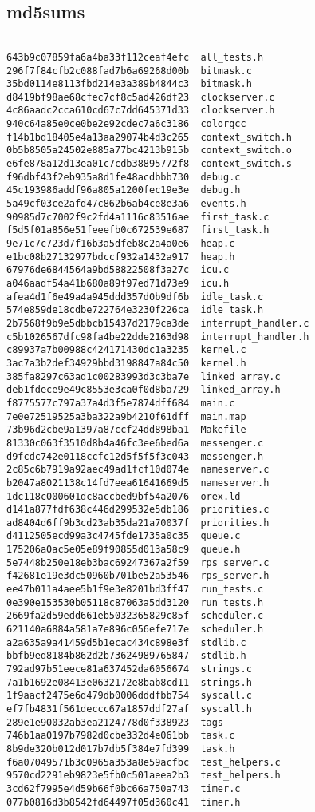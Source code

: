 \documentclass[letterpaper]{article}
\begin{document}
\subsection{md5sums}
\begin{verbatim}

643b9c07859fa6a4ba33f112ceaf4efc  all_tests.h
296f7f84cfb2c088fad7b6a69268d00b  bitmask.c
35bd0114e8113fbd214e3a389b4844c3  bitmask.h
d8419bf98ae68cfec7cf8c5ad426df23  clockserver.c
4c86aadc2cca610cd67c7dd645371d33  clockserver.h
940c64a85e0ce0be2e92cdec7a6c3186  colorgcc
f14b1bd18405e4a13aa29074b4d3c265  context_switch.h
0b5b8505a24502e885a77bc4213b915b  context_switch.o
e6fe878a12d13ea01c7cdb38895772f8  context_switch.s
f96dbf43f2eb935a8d1fe48acdbbb730  debug.c
45c193986addf96a805a1200fec19e3e  debug.h
5a49cf03ce2afd47c862b6ab4ce8e3a6  events.h
90985d7c7002f9c2fd4a1116c83516ae  first_task.c
f5d5f01a856e51feeefb0c672539e687  first_task.h
9e71c7c723d7f16b3a5dfeb8c2a4a0e6  heap.c
e1bc08b27132977bdccf932a1432a917  heap.h
67976de6844564a9bd58822508f3a27c  icu.c
a046aadf54a41b680a89f97ed71d73e9  icu.h
afea4d1f6e49a4a945ddd357d0b9df6b  idle_task.c
574e859de18cdbe722764e3230f226ca  idle_task.h
2b7568f9b9e5dbbcb15437d2179ca3de  interrupt_handler.c
c5b1026567dfc98fa4be22dde2163d98  interrupt_handler.h
c89937a7b00988c424171430dc1a3235  kernel.c
3ac7a3b2def34929bbd3198847a84c50  kernel.h
385fa8297c63ad1c00283993d3c3ba7e  linked_array.c
deb1fdece9e49c8553e3ca0f0d8ba729  linked_array.h
f8775577c797a37a4d3f5e7874dff684  main.c
7e0e72519525a3ba322a9b4210f61dff  main.map
73b96d2cbe9a1397a87ccf24dd898ba1  Makefile
81330c063f3510d8b4a46fc3ee6bed6a  messenger.c
d9fcdc742e0118ccfc12d5f5f5f3c043  messenger.h
2c85c6b7919a92aec49ad1fcf10d074e  nameserver.c
b2047a8021138c14fd7eea61641669d5  nameserver.h
1dc118c000601dc8accbed9bf54a2076  orex.ld
d141a877fdf638c446d299532e5db186  priorities.c
ad8404d6ff9b3cd23ab35da21a70037f  priorities.h
d4112505ecd99a3c4745fde1735a0c35  queue.c
175206a0ac5e05e89f90855d013a58c9  queue.h
5e7448b250e18eb3bac69247367a2f59  rps_server.c
f42681e19e3dc50960b701be52a53546  rps_server.h
ee47b011a4aee5b1f9e3e8201bd3ff47  run_tests.c
0e390e153530b05118c87063a5dd3120  run_tests.h
2669fa2d59edd661eb5032365829c85f  scheduler.c
621140a6884a581a7e896c056efe717e  scheduler.h
a2a635a9a41459d5b1ecac434c898e3f  stdlib.c
bbfb9ed8184b862d2b73624989765847  stdlib.h
792ad97b51eece81a637452da6056674  strings.c
7a1b1692e08413e0632172e8bab8cd11  strings.h
1f9aacf2475e6d479db0006dddfbb754  syscall.c
ef7fb4831f561deccc67a1857ddf27af  syscall.h
289e1e90032ab3ea2124778d0f338923  tags
746b1aa0197b7982d0cbe332d4e061bb  task.c
8b9de320b012d017b7db5f384e7fd399  task.h
f6a07049571b3c0965a353a8e59acfbc  test_helpers.c
9570cd2291eb9823e5fb0c501aeea2b3  test_helpers.h
3cd62f7995e4d59b66f0bc66a750a743  timer.c
077b0816d3b8542fd64497f05d360c41  timer.h


\end{verbatim}
\end{document}
